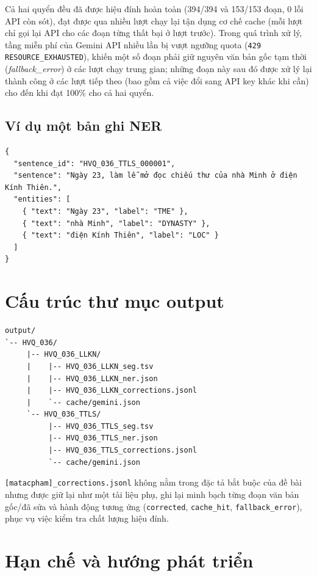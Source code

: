 \documentclass[12pt,a4paper]{article}
\begin{document}
Cả hai quyển đều đã được hiệu đính hoàn toàn (394/394 và 153/153 đoạn, 0 lỗi
API còn sót), đạt được qua nhiều lượt chạy lại tận dụng cơ chế cache (mỗi lượt
chỉ gọi lại API cho các đoạn từng thất bại ở lượt trước). Trong quá trình xử
lý, tầng miễn phí của Gemini API nhiều lần bị vượt ngưỡng quota
(\texttt{429 RESOURCE\_EXHAUSTED}), khiến một số đoạn phải giữ nguyên văn bản
gốc tạm thời (\emph{fallback\_error}) ở các lượt chạy trung gian; những đoạn
này sau đó được xử lý lại thành công ở các lượt tiếp theo (bao gồm cả việc đổi
sang API key khác khi cần) cho đến khi đạt 100\% cho cả hai quyển.

\subsection{Ví dụ một bản ghi NER}

\begin{verbatim}
{
  "sentence_id": "HVQ_036_TTLS_000001",
  "sentence": "Ngày 23, làm lễ mở đọc chiếu thư của nhà Minh ở điện Kính Thiên.",
  "entities": [
    { "text": "Ngày 23", "label": "TME" },
    { "text": "nhà Minh", "label": "DYNASTY" },
    { "text": "điện Kính Thiên", "label": "LOC" }
  ]
}
\end{verbatim}

\section{Cấu trúc thư mục output}

\begin{lstlisting}
output/
`-- HVQ_036/
     |-- HVQ_036_LLKN/
     |    |-- HVQ_036_LLKN_seg.tsv
     |    |-- HVQ_036_LLKN_ner.json
     |    |-- HVQ_036_LLKN_corrections.jsonl
     |    `-- cache/gemini.json
     `-- HVQ_036_TTLS/
          |-- HVQ_036_TTLS_seg.tsv
          |-- HVQ_036_TTLS_ner.json
          |-- HVQ_036_TTLS_corrections.jsonl
          `-- cache/gemini.json
\end{lstlisting}

\texttt{[matacpham]\_corrections.jsonl} không nằm trong đặc tả bắt buộc của đề
bài nhưng được giữ lại như một tài liệu phụ, ghi lại minh bạch từng đoạn văn
bản gốc/đã sửa và hành động tương ứng (\texttt{corrected}, \texttt{cache\_hit},
\texttt{fallback\_error}), phục vụ việc kiểm tra chất lượng hiệu đính.

\section{Hạn chế và hướng phát triển}
\end{document}
